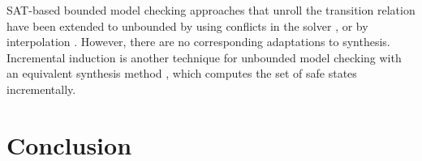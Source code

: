 \documentclass{llncs}
\begin{document}
SAT-based bounded model checking approaches that unroll the transition relation
have been extended to unbounded by using conflicts in the solver
\cite{mcmillan2002}, or by interpolation \cite{mcmillan2003}. However, there
are no corresponding adaptations to synthesis. Incremental induction
\cite{bradley2011} is another technique for unbounded model checking with an
equivalent synthesis method \cite{morgenstern2013}, which computes the set of
safe states incrementally.

\section{Conclusion}




\end{document}
